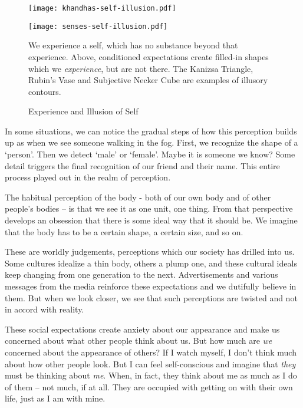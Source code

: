 \clearpage

\enlargethispage*{3\baselineskip}

\begin{figure}[h]
\caption{Experience and Illusion of Self}\label{fig-illusion-of-self}

\centering

\texttt{[image: khandhas-self-illusion.pdf]}

\bigskip

\texttt{[image: senses-self-illusion.pdf]}

\bigskip

We experience a self, which has no substance beyond that experience.
Above, conditioned expectations create filled-in shapes which we \emph{experience}, but are not there.
The Kanizsa Triangle, Rubin's Vase and Subjective Necker Cube are examples of illusory contours.

\end{figure}

\clearpage

In some situations, we can notice the gradual steps of how this
perception builds up as when we see someone walking in the fog. First,
we recognize the shape of a `person'. Then we detect `male' or `female'.
Maybe it is someone we know? Some detail triggers the final recognition
of our friend and their name. This entire process played out in the
realm of perception.

The habitual perception of the body - both of our own body and of other
people's bodies -- is that we see it as one unit, one thing. From that
perspective develops an obsession that there is some ideal way that it
should be. We imagine that the body has to be a certain shape, a certain
size, and so on.

These are worldly judgements, perceptions which our society has drilled
into us. Some cultures idealize a thin body, others a plump one, and
these cultural ideals keep changing from one generation to the next.
Advertisements and various messages from the media reinforce these
expectations and we dutifully believe in them. But when we look closer,
we see that such perceptions are twisted and not in accord with reality.

These social expectations create anxiety about our appearance and make
us concerned about what other people think about us. But how much are
\emph{we} concerned about the appearance of others? If I watch myself, I
don't think much about how other people look. But I can feel
self-conscious and imagine that \emph{they} must be thinking about
\emph{me}. When, in fact, they think about me as much as I do of them --
not much, if at all. They are occupied with getting on with their own
life, just as I am with mine.

